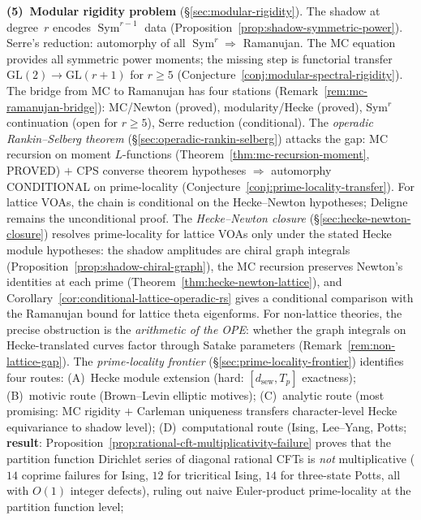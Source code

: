 \smallskip\noindent
\textbf{(5)~Modular rigidity problem}
(\S\ref{sec:modular-rigidity}).
The shadow at degree~$r$ encodes
$\operatorname{Sym}^{r-1}$ data
(Proposition~\ref{prop:shadow-symmetric-power}).
Serre's reduction: automorphy of all
$\operatorname{Sym}^r \Rightarrow$ Ramanujan.
The MC equation provides all symmetric power moments;
the missing step is functorial transfer
$\mathrm{GL}(2) \to \mathrm{GL}(r{+}1)$ for $r \ge 5$
(Conjecture~\ref{conj:modular-spectral-rigidity}).
The bridge from MC to Ramanujan has four stations
(Remark~\ref{rem:mc-ramanujan-bridge}): MC/Newton (proved),
modularity/Hecke (proved),
Sym$^r$ continuation (open for $r \ge 5$),
Serre reduction (conditional).
The \emph{operadic Rankin--Selberg theorem}
(\S\ref{sec:operadic-rankin-selberg}) attacks the gap:
MC recursion on moment $L$-functions
(Theorem~\ref{thm:mc-recursion-moment}, PROVED)
$+$ CPS converse theorem hypotheses
$\Rightarrow$ automorphy CONDITIONAL on prime-locality
(Conjecture~\ref{conj:prime-locality-transfer}).
For lattice VOAs, the chain is conditional on the Hecke--Newton
hypotheses; Deligne remains the unconditional proof.
The \emph{Hecke--Newton closure}
(\S\ref{sec:hecke-newton-closure}) resolves prime-locality for
lattice VOAs only under the stated Hecke module hypotheses: the shadow amplitudes
are chiral graph integrals
(Proposition~\ref{prop:shadow-chiral-graph}), the MC recursion
preserves Newton's identities at each prime
(Theorem~\ref{thm:hecke-newton-lattice}), and
Corollary~\ref{cor:conditional-lattice-operadic-rs} gives a conditional
comparison with the Ramanujan bound for lattice theta eigenforms.
For non-lattice theories, the precise obstruction is the
\emph{arithmetic of the OPE}: whether the graph integrals on
Hecke-translated curves factor through Satake parameters
(Remark~\ref{rem:non-lattice-gap}).
The \emph{prime-locality frontier}
(\S\ref{sec:prime-locality-frontier}) identifies four routes:
(A)~Hecke module extension (hard: $[d_{\mathrm{sew}}, T_p]$
exactness);
(B)~motivic route (Brown--Levin elliptic motives);
(C)~analytic route (most promising: MC rigidity
$+$ Carleman uniqueness transfers character-level Hecke
equivariance to shadow level);
(D)~computational route (Ising, Lee--Yang, Potts;
\textbf{result}: Proposition~\ref{prop:rational-cft-multiplicativity-failure}
proves that the partition function Dirichlet series of diagonal
rational CFTs is \emph{not} multiplicative ($14$ coprime failures
for Ising, $12$ for tricritical Ising, $14$ for three-state Potts,
all with $O(1)$ integer defects), ruling out naive Euler-product
prime-locality at the partition function level;
